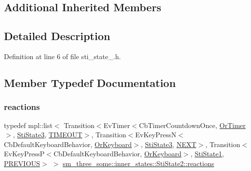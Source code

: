 \subsection*{Additional Inherited Members}


\subsection{Detailed Description}


Definition at line 6 of file sti\+\_\+state\+\_.\+h.



\subsection{Member Typedef Documentation}
\mbox{\label{structsm__three__some_1_1inner__states_1_1StiState2_a35556a3ab61ab56f2aa5d896b8330082}} 
\subsubsection{\texorpdfstring{reactions}{reactions}}
{\footnotesize\ttfamily typedef mpl\+::list$<$ Transition$<$Ev\+Timer$<$Cb\+Timer\+Countdown\+Once, \hyperlink{classsm__three__some_1_1OrTimer}{Or\+Timer}$>$, \hyperlink{structsm__three__some_1_1inner__states_1_1StiState3}{Sti\+State3}, \hyperlink{structsm__three__some_1_1inner__states_1_1StiState2_1_1TIMEOUT}{T\+I\+M\+E\+O\+UT}$>$, Transition$<$Ev\+Key\+PressN$<$Cb\+Default\+Keyboard\+Behavior, \hyperlink{classsm__three__some_1_1OrKeyboard}{Or\+Keyboard}$>$, \hyperlink{structsm__three__some_1_1inner__states_1_1StiState3}{Sti\+State3}, \hyperlink{structsm__three__some_1_1inner__states_1_1StiState2_1_1NEXT}{N\+E\+XT}$>$, Transition$<$Ev\+Key\+PressP$<$Cb\+Default\+Keyboard\+Behavior, \hyperlink{classsm__three__some_1_1OrKeyboard}{Or\+Keyboard}$>$, \hyperlink{structsm__three__some_1_1inner__states_1_1StiState1}{Sti\+State1}, \hyperlink{structsm__three__some_1_1inner__states_1_1StiState2_1_1PREVIOUS}{P\+R\+E\+V\+I\+O\+US}$>$ $>$ \hyperlink{structsm__three__some_1_1inner__states_1_1StiState2_a35556a3ab61ab56f2aa5d896b8330082}{sm\+\_\+three\+\_\+some\+::inner\+\_\+states\+::\+Sti\+State2\+::reactions}}



